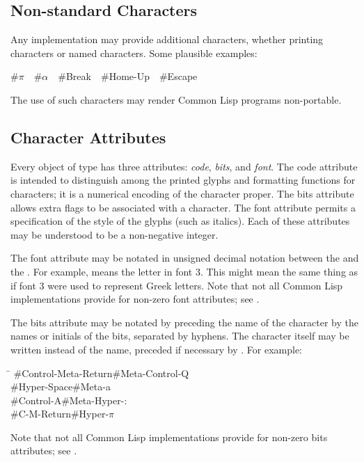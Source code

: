 \subsection{Non-standard Characters}

Any implementation may provide additional characters, whether printing
characters or named characters.  Some plausible examples:

\newpage%

\begin{lisp}
\#{\Xbackslash}\(\pi\)~~\#{\Xbackslash}\(\alpha\)~~\#{\Xbackslash}Break~~\#{\Xbackslash}Home-Up~~\#{\Xbackslash}Escape
\end{lisp}
The use of such characters may render Common Lisp programs non-portable.

\begin{obsolete}
\subsection{Character Attributes}

Every object of type 
has three attributes: {\it code}, {\it bits}, and {\it font}.
The code attribute is intended to distinguish among the printed glyphs
and formatting functions for characters; it is a numerical encoding
of the character proper.
The bits attribute allows extra
flags to be associated with a character.  The font attribute permits
a specification of the style of the glyphs (such as italics).
Each of these attributes may be understood to be a non-negative integer.

The font attribute may be notated in unsigned decimal notation
between the \cd{\#} and the \cd{{\Xbackslash}}.  For example,
 means the letter  in font 3.
This might mean the same thing as \cd{\#{\Xbackslash}$\alpha$} if font 3
were used to represent Greek letters.
Note that not all Common Lisp implementations provide for non-zero
font attributes; see .

The bits attribute may be notated
by preceding the name of the character by the names or initials
of the bits,
separated by hyphens.  The character itself may be written
instead of the name, preceded if necessary by \cd{{\Xbackslash}}.  For example:
\begin{lisp}
\textwidth\=\kill
\#{\Xbackslash}Control-Meta-Return\>\#{\Xbackslash}Meta-Control-Q \\
\#{\Xbackslash}Hyper-Space\>\#{\Xbackslash}Meta-{\Xbackslash}a \\
\#{\Xbackslash}Control-A\>\#{\Xbackslash}Meta-Hyper-{\Xbackslash}: \\
\#{\Xbackslash}C-M-Return\>\#{\Xbackslash}Hyper-{\Xbackslash}\(\pi\)
\end{lisp}
Note that not all Common Lisp implementations provide for non-zero
bits attributes; see .
\end{obsolete}

